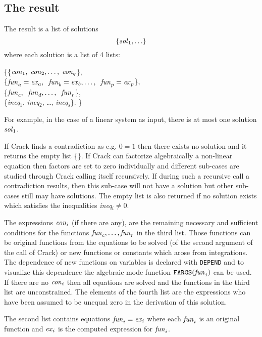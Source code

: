 \documentclass[12pt]{article}
\begin{document}
\subsection{The result}  
The result is a list of solutions 
\[      \{{\it sol}_1, \ldots \}  \]
where each solution is a list of 4 lists:
\begin{tabbing}
    \{\=\{${\it con}_1, \; {\it con}_2, \ldots , \; {\it con}_q$\}, \\
      \>\{${\it fun}_a={\it ex}_a, \;\;
{\it fun}_b={\it ex}_b, \ldots , \;\; {\it fun}_p={\it ex}_p$\},\=  \\
      \>\{${\it fun}_c, \;\; {\it fun}_d, \ldots , \;\; {\it fun}_r$\}, \> \\
      \>\{{\it ineq}$_1$, {\it ineq}$_2$, \ldots , {\it ineq}$_s$\}. \>  \}
\end{tabbing}
For example, in the case of a linear system as input, there is
at most one solution ${\it sol}_1$.

If {\sc Crack} finds a contradiction as e.g. $0=1$ then there exists no
solution and it returns the empty list \{\}. If {\sc Crack}
can factorize algebraically a non-linear equation then factors are set
to zero individually and different sub-cases are studied through
{\sc Crack} calling itself recursively.
If during such a recursive call a contradiction results,
then this sub-case will not have a solution but other sub-cases still
may have solutions.
The empty list is also returned if no solution exists 
which satisfies the inequalities
{\it ineq}$_i \neq 0.$ 

The expressions ${\it con}_i$ (if there are any), are the
remaining necessary and sufficient conditions for the functions
${\it fun}_c,\ldots,{\it fun}_r$ in the third list. Those
functions can be original functions from the equations to be
solved (of the second argument of the call of {\sc Crack}) or new
functions or constants which arose from integrations. 
The dependence of new functions on variables is declared with {\tt DEPEND}
and to visualize this dependence the algebraic mode function
${\tt FARGS({\it fun}_i)}$ can be used.
If there are no ${\it con}_i$ then all equations are solved and the
functions in the third list are unconstrained. The elements of the fourth
list are the expressions who have been assumed to be unequal zero
in the derivation of this solution.

The second list contains
equations ${\it fun}_i={\it ex}_i$ where each ${\it fun}_i$ is an
original function and ${\it ex}_i$ is the computed expression
for ${\it fun}_i$.
\end{document}

